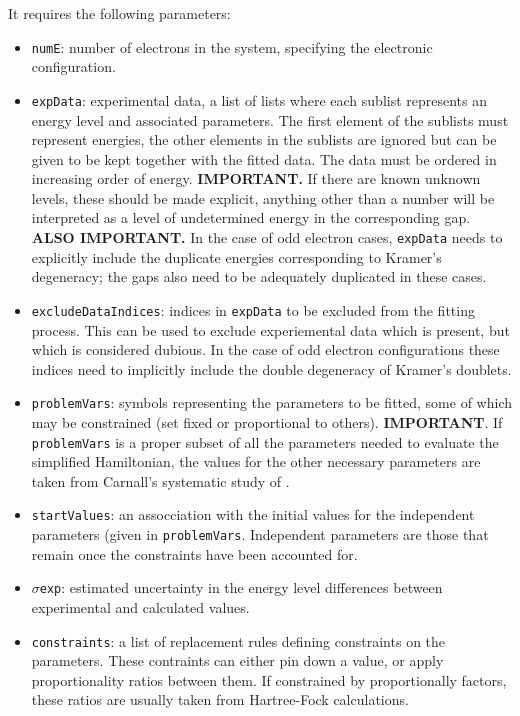 \documentclass{article}
\newcommand{\codetext}[1]{{\color{BlueViolet} \texttt{#1}}}
\begin{document}
It requires the following parameters:
\begin{itemize}
	\item \codetext{numE}: number of electrons in the system, specifying the electronic configuration.

	\item \codetext{expData}: experimental data, a list of lists where each sublist represents an energy level and associated parameters. The first element of the sublists must represent energies, the other elements in the sublists are ignored but can be given to be kept together with the fitted data. The data must be ordered in increasing order of energy. \textbf{IMPORTANT.} If there are known unknown levels, these should be made explicit, anything other than a number will be interpreted as a level of undetermined energy in the corresponding gap. \textbf{ALSO IMPORTANT.} In the case of odd electron cases, \codetext{expData} needs to explicitly include the duplicate energies corresponding to Kramer's degeneracy; the gaps also need to be adequately duplicated in these cases.  

	\item \codetext{excludeDataIndices}: indices in \codetext{expData} to be excluded from the fitting process. This can be used to exclude experiemental data which is present, but which is considered dubious. In the case of odd electron configurations these indices need to implicitly include the double degeneracy of Kramer's doublets.

	\item \codetext{problemVars}: symbols representing the parameters to be fitted, some of which may be constrained (set fixed or proportional to others). \textbf{IMPORTANT}. If \codetext{problemVars} is a proper subset of all the parameters needed to evaluate the simplified Hamiltonian, the values for the other necessary parameters are taken from Carnall's systematic study of \LaFthree.

	\item \codetext{startValues}: an assocciation with the initial values for the independent parameters (given in \codetext{problemVars}. Independent parameters are those that remain once the constraints have been accounted for.

	\item \codetext{$\sigma$exp}: estimated uncertainty in the energy level differences between experimental and calculated values.

	\item \codetext{constraints}: a list of replacement rules defining constraints on the parameters. These contraints can either pin down a value, or apply proportionality ratios between them. If constrained by proportionally factors, these ratios are usually taken from Hartree-Fock calculations.
\end{itemize}
\end{document}
